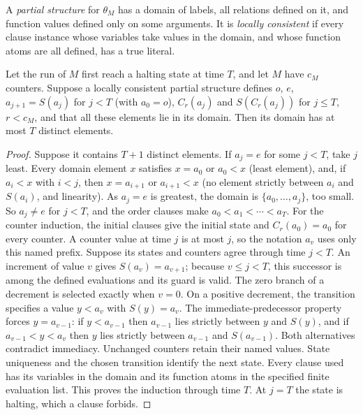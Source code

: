 A \emph{partial structure} for $\theta_M$ has a domain of labels, all relations defined on it, and
function values defined only on some arguments. It is \emph{locally consistent} if every clause
instance whose variables take values in the domain, and whose function atoms are all defined,
has a true literal.

\begin{lemma}\label{lem:local-switch}
Let the run of $M$ first reach a halting state at time $T$, and let $M$ have $c_M$ counters.
Suppose a locally consistent partial structure defines $o$, $e$, $a_{j+1}=S(a_j)$ for $j<T$
\textup{(}with $a_0=o$\textup{)}, $C_r(a_j)$ and $S(C_r(a_j))$ for $j\le T$, $r<c_M$, and that all these
elements lie in its domain. Then its domain has at most $T$ distinct elements.
\end{lemma}
\begin{proof}
Suppose it contains $T+1$ distinct elements. If $a_j=e$ for some $j<T$, take $j$ least. Every
domain element $x$ satisfies $x=a_0$ or $a_0<x$ (least element), and, if $a_i<x$ with $i<j$, then
$x=a_{i+1}$ or $a_{i+1}<x$ (no element strictly between $a_i$ and $S(a_i)$, and linearity). As
$a_j=e$ is greatest, the domain is $\{a_0,\ldots,a_j\}$, too small. So $a_j\ne e$ for $j<T$, and
the order clauses make $a_0<a_1<\cdots<a_T$. For the counter induction, the initial clauses give the initial
state and $C_r(a_0)=a_0$ for every counter. A counter value at time $j$
is at most $j$, so the notation $a_v$ uses only this named prefix.
Suppose its states and counters agree through time $j<T$.
An increment of value $v$ gives $S(a_v)=a_{v+1}$; because $v\le j<T$,
this successor is among the defined evaluations and its guard is valid.
The zero branch of a decrement is selected exactly when $v=0$.
On a positive decrement, the transition specifies a value $y<a_v$
with $S(y)=a_v$. The immediate-predecessor property forces
$y=a_{v-1}$: if $y<a_{v-1}$ then $a_{v-1}$ lies strictly between
$y$ and $S(y)$, and if $a_{v-1}<y<a_v$ then $y$ lies strictly
between $a_{v-1}$ and $S(a_{v-1})$. Both alternatives contradict
immediacy. Unchanged counters retain their named values. State
uniqueness and the chosen transition identify the next state.
Every clause used has its variables in the domain and its function
atoms in the specified finite evaluation list. This proves the
induction through time $T$. At $j=T$ the state is halting, which a clause forbids.
\end{proof}

